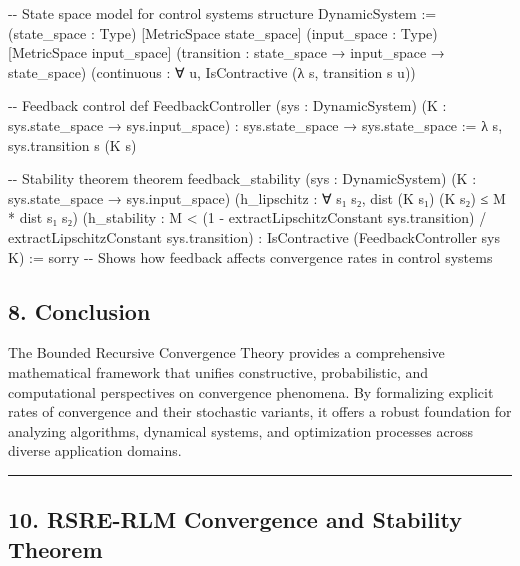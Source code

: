 \documentclass[
]{article}
\newenvironment{Shaded}{}{}
\newcommand{\NormalTok}[1]{#1}
\begin{document}
\begin{Shaded}
\begin{Highlighting}[]
\NormalTok{{-}{-} State space model for control systems}
\NormalTok{structure DynamicSystem :=}
\NormalTok{  (state\_space : Type) [MetricSpace state\_space]}
\NormalTok{  (input\_space : Type) [MetricSpace input\_space]}
\NormalTok{  (transition : state\_space → input\_space → state\_space)}
\NormalTok{  (continuous : ∀ u, IsContractive (λ s, transition s u))}

\NormalTok{{-}{-} Feedback control}
\NormalTok{def FeedbackController (sys : DynamicSystem) (K : sys.state\_space → sys.input\_space)}
\NormalTok{  : sys.state\_space → sys.state\_space :=}
\NormalTok{  λ s, sys.transition s (K s)}

\NormalTok{{-}{-} Stability theorem}
\NormalTok{theorem feedback\_stability}
\NormalTok{  (sys : DynamicSystem) (K : sys.state\_space → sys.input\_space)}
\NormalTok{  (h\_lipschitz : ∀ s₁ s₂, dist (K s₁) (K s₂) ≤ M * dist s₁ s₂)}
\NormalTok{  (h\_stability : M \textless{} (1 {-} extractLipschitzConstant sys.transition) / extractLipschitzConstant sys.transition) :}
\NormalTok{  IsContractive (FeedbackController sys K) :=}
\NormalTok{  sorry {-}{-} Shows how feedback affects convergence rates in control systems}
\end{Highlighting}
\end{Shaded}

\subsection{8. Conclusion}\label{conclusion-3}

The Bounded Recursive Convergence Theory provides a comprehensive
mathematical framework that unifies constructive, probabilistic, and
computational perspectives on convergence phenomena. By formalizing
explicit rates of convergence and their stochastic variants, it offers a
robust foundation for analyzing algorithms, dynamical systems, and
optimization processes across diverse application domains.

\begin{center}\rule{0.5\linewidth}{0.5pt}\end{center}

\subsection{10. RSRE-RLM Convergence and Stability
Theorem}\label{10-rsre-rlm-convergence-stability}
\end{document}
